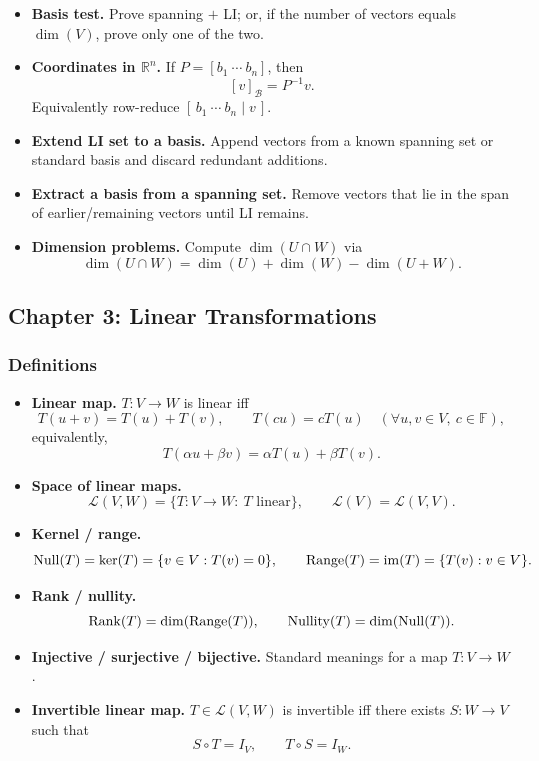 \begin{itemize}[leftmargin=*]
\item \textbf{Basis test.} Prove spanning $+$ LI; or, if the number of vectors equals $\dim(V)$, prove only one of the two.

\item \textbf{Coordinates in $\mathbb R^n$.} If $P=[b_1\ \cdots\ b_n]$, then
\[
[v]_{\mathcal B}=P^{-1}v.
\]
Equivalently row-reduce $[\,b_1\ \cdots\ b_n\mid v\,]$.

\item \textbf{Extend LI set to a basis.} Append vectors from a known spanning set or standard basis and discard redundant additions.

\item \textbf{Extract a basis from a spanning set.} Remove vectors that lie in the span of earlier/remaining vectors until LI remains.

\item \textbf{Dimension problems.} Compute $\dim(U\cap W)$ via
\[
\dim(U\cap W)=\dim(U)+\dim(W)-\dim(U+W).
\]
\end{itemize}

\subsection*{Chapter 3: Linear Transformations}

\subsubsection*{Definitions}

\begin{itemize}[leftmargin=*]
\item \textbf{Linear map.} $T:V\to W$ is linear iff
\[
T(u+v)=T(u)+T(v),
\qquad
T(cu)=cT(u)
\quad(\forall u,v\in V,\ c\in\mathbb F),
\]
equivalently,
\[
T(\alpha u+\beta v)=\alpha T(u)+\beta T(v).
\]

\item \textbf{Space of linear maps.}
\[
\mathcal L(V,W)=\{T:V\to W:\ T\text{ linear}\},
\qquad
\mathcal L(V)=\mathcal L(V,V).
\]

\item \textbf{Kernel / range.}
\[
\operatorname{Null}(T)=\ker(T)=\{v\in V:T(v)=0\},
\qquad
\operatorname{Range}(T)=\operatorname{im}(T)=\{T(v):v\in V\}.
\]

\item \textbf{Rank / nullity.}
\[
\operatorname{Rank}(T)=\dim(\operatorname{Range}(T)),
\qquad
\operatorname{Nullity}(T)=\dim(\operatorname{Null}(T)).
\]

\item \textbf{Injective / surjective / bijective.} Standard meanings for a map $T:V\to W$.

\item \textbf{Invertible linear map.} $T\in\mathcal L(V,W)$ is invertible iff there exists $S:W\to V$ such that
\[
S\circ T=I_V,
\qquad
T\circ S=I_W.
\]
\end{itemize}

